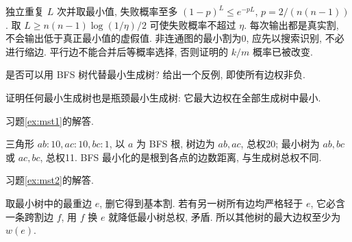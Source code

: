 独立重复 $L$ 次并取最小值, 失败概率至多 $(1-p)^L\le e^{-pL}$, $p=2/(n(n-1))$. 取 $L\ge n(n-1)\log(1/\eta)/2$ 可使失败概率不超过 $\eta$. 每次输出都是真实割, 不会输出低于真正最小值的虚假值. 非连通图的最小割为0, 应先以搜索识别, 不必进行缩边. 平行边不能合并后等概率选择, 否则证明的 $k/m$ 概率已被改变.
\begin{exercise}\label{ex:mst1}
是否可以用 BFS 树代替最小生成树? 给出一个反例, 即使所有边权非负.
\end{exercise}
\begin{exercise}\label{ex:mst2}
证明任何最小生成树也是瓶颈最小生成树: 它最大边权在全部生成树中最小.
\end{exercise}
习题\ref{ex:mst1}的解答.
\begin{solution}
三角形 $ab:10,ac:10,bc:1$, 以 $a$ 为 BFS 根, 树边为 $ab,ac$, 总权20; 最小树为 $ab,bc$ 或 $ac,bc$, 总权11. BFS 最小化的是根到各点的边数距离, 与生成树总权不同.
\end{solution}
习题\ref{ex:mst2}的解答.
\begin{solution}
取最小树中的最重边 $e$, 删它得到基本割. 若有另一树所有边均严格轻于 $e$, 它必含一条跨割边 $f$, 用 $f$ 换 $e$ 就降低最小树总权, 矛盾. 所以其他树的最大边权至少为 $w(e)$.
\end{solution}
